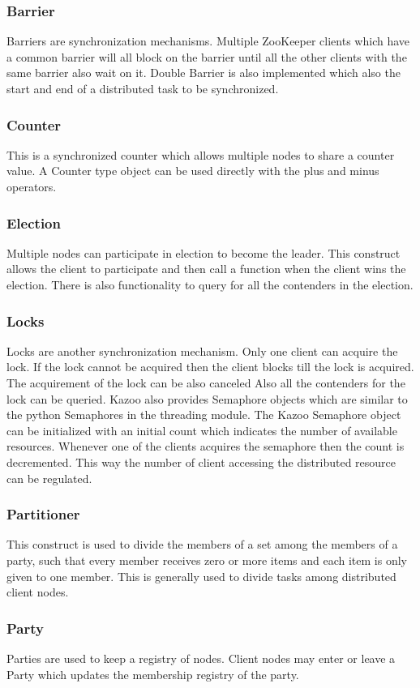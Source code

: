   \subsubsection{Barrier}
    Barriers are synchronization mechanisms. Multiple ZooKeeper clients which have a common barrier will all block on the barrier until all the other clients with the same barrier also wait on it. Double Barrier is also implemented which also the start and end of a distributed task to be synchronized.
  \subsubsection{Counter}
  This is a synchronized counter which allows multiple nodes to share a counter value. A Counter type object can be used directly with the plus and minus operators.
  \subsubsection{Election}
  Multiple nodes can participate in election to become the leader. This construct allows the client to participate and then call a function when the client wins the election. There is also functionality to query for all the contenders in the election.
  \subsubsection{Locks}
    Locks are another synchronization mechanism. Only one client can acquire the lock. If the lock cannot be acquired then the client blocks till the lock is acquired. The acquirement of the lock can be also canceled Also all the contenders for the lock can be queried. Kazoo also provides Semaphore objects which are similar to the python Semaphores in the threading module. The Kazoo Semaphore object can be initialized with an initial count which indicates the number of available resources. Whenever one of the clients acquires the semaphore then the count is decremented. This way the number of client accessing the distributed resource can be regulated.
  \subsubsection{Partitioner}
  This construct is used to divide the members of a set among the members of a party, such that every member receives zero or more items and each item is only given to one member. This is generally used to divide tasks among distributed client nodes.
  \subsubsection{Party}
    Parties are used to keep a registry of nodes. Client nodes may enter or leave a Party which updates the membership registry of the party.
